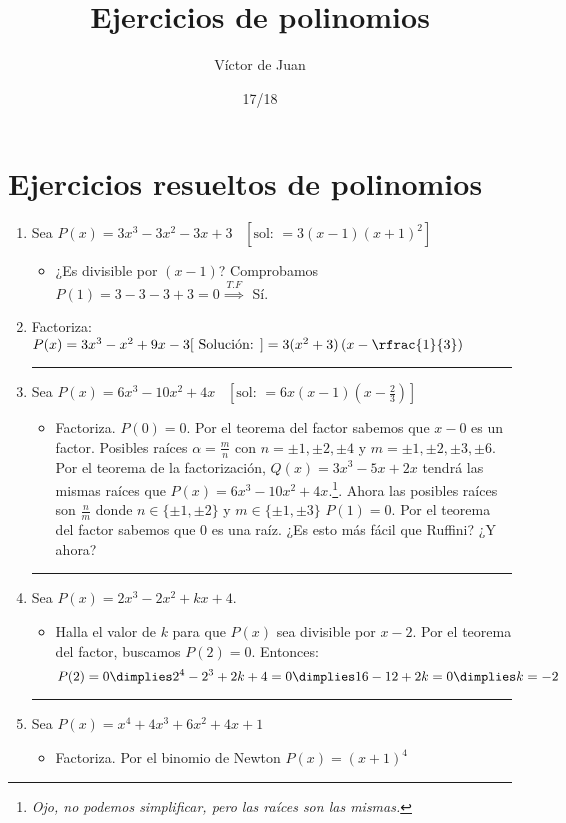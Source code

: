 \documentclass[palatino,nosec]{Docencia}
\title{Ejercicios de polinomios}
\author{Víctor de Juan}
\date{17/18}
\begin{document}
\section{Ejercicios resueltos de polinomios}

\begin{enumerate}

\item Sea $P(x) = 3x^3-3x^2-3x+3 \;\;\; [\text{sol: } = 3(x-1)(x+1)^2]$
\begin{itemize}
	\item ¿Es divisible por $(x-1)$? Comprobamos $P(1) = 3-3-3+3 = 0 \overset{T.F}{\implies}$ Sí.
\end{itemize}

\item Factoriza: $P(x) = 3x^3-x^2+9x-3 [\text{ Solución: }] = 3(x^2+3)\left(x-\rfrac{1}{3}\right)$
\hrule



\item Sea $P(x) = 6x^3-10x^2+4x \;\;\; [\text{sol: } = 6x(x-1)(x-\frac{2}{3})]$
\begin{itemize}
	\item Factoriza.
	\subitem $P(0) = 0$. Por el teorema del factor sabemos que $x-0$ es un factor.
	\subitem Posibles raíces $α=\frac{m}{n}$ con $n=±1,\pm2,\pm4$ y $m=\pm1,\pm2,\pm3,\pm6$.	
	\subitem Por el teorema de la factorización, $Q(x) = 3x^3-5x+2x$ tendrá las mismas raíces que $P(x) = 6x^3-10x^2+4x$.\footnote{\textit{Ojo, no podemos simplificar, pero las raíces son las mismas.}}. Ahora las posibles raíces son $\frac{n}{m}$ donde $n\in\{\pm1,\pm2\}$ y $m\in\{\pm1,\pm3\}$
	\subitem $P(1) = 0$. Por el teorema del factor sabemos que $0$ es una raíz. ¿Es esto más fácil que Ruffini? ¿Y ahora?
\end{itemize}

\hrule

\item Sea $P(x) = 2x^3-2x^2+kx+4$.
\begin{itemize}
	\item Halla el valor de $k$ para que $P(x)$ sea divisible por $x-2$.
	\subitem Por el teorema del factor, buscamos $P(2) = 0$. Entonces:
	\[
		P(2) = 0 \dimplies 2^4-2^3+2k+4 = 0 \dimplies 16-12+2k = 0 \dimplies k = -2
	\]
\end{itemize}


\hrule

\item Sea $P(x) = x^4+4x^3+6x^2+4x+1$
\begin{itemize}
	\item Factoriza.
	\subitem Por el binomio de Newton $P(x) = (x+1)^4$
\end{itemize}


\end{enumerate}
\end{document}
